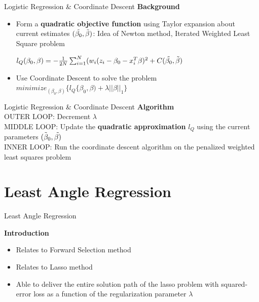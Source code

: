 \documentclass{beamer}
\begin{document}
\begin{frame}{Logistic Regression \& Coordinate Descent}
\textbf{Background}
\vspace*{3mm}
\begin{itemize}
    \item Form a \textbf{quadratic objective function} using Taylor expansion about current estimates \((\Tilde{\beta_0},\Tilde{\beta})\): Idea of Newton method, Iterated Weighted Least Square problem  
\vspace*{3mm}
    
\(l_Q(\beta_0,\beta)=-\frac{1}{2N}\sum_{i=1}^{N}(w_i(z_i-\beta_0-x_i^T\beta)^2+C(\Tilde{\beta_0},\Tilde{\beta})\) 

\vspace*{3mm}

\item Use Coordinate Descent to solve the problem  \\ 
\vspace*{2mm}
\(minimize_{(\beta_0 , \beta)} \big\{ l_Q \{\beta_0,\beta)+\lambda \lvert \lvert \beta \lvert\lvert_{1} \big\} \)

\end{itemize}
\end{frame}

\begin{frame}{Logistic Regression \& Coordinate Descent}
\textbf{Algorithm}\\
\vspace*{3mm}
OUTER LOOP: Decrement $\lambda$ \\
\vspace*{3mm}
MIDDLE LOOP: Update the \textbf{quadratic approximation} $l_{Q}$ using the current parameters \(\Tilde{(\beta_0},\Tilde{\beta)}\)\\
\vspace*{3mm}
INNER LOOP: Run the coordinate descent algorithm on the penalized weighted least squares problem


\end{frame}
\section{Least Angle Regression}
\begin{frame}{Least Angle Regression}

\textbf{Introduction}
\vspace*{3mm}
\begin{itemize}
    \item Relates to Forward Selection method
    \vspace*{3mm}
    \item Relates to Lasso method 
     \vspace*{3mm}
    \item Able to deliver the entire solution path of the lasso problem with squared-error loss as a function of the regularization parameter $\lambda$
\end{itemize}
\end{frame}
\end{document}
